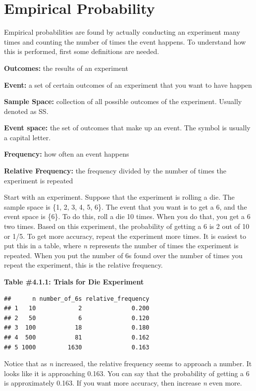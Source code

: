 \documentclass[
]{book}
\begin{document}
\hypertarget{empirical-probability}{%
\section{Empirical Probability}\label{empirical-probability}}

Empirical probabilities are found by actually conducting an experiment many times and counting the number of times the event happens. To understand how this is performed, first some definitions are needed.

\textbf{Outcomes:} the results of an experiment

\textbf{Event:} a set of certain outcomes of an experiment that you want to have happen

\textbf{Sample Space:} collection of all possible outcomes of the experiment. Usually denoted as SS.

\textbf{Event space:} the set of outcomes that make up an event. The symbol is usually a capital letter.

\textbf{Frequency:} how often an event happens

\textbf{Relative Frequency:} the frequency divided by the number of times the experiment is repeated

Start with an experiment. Suppose that the experiment is rolling a die. The sample space is \{1, 2, 3, 4, 5, 6\}. The event that you want is to get a 6, and the event space is \{6\}. To do this, roll a die 10 times. When you do that, you get a 6 two times. Based on this experiment, the probability of getting a 6 is 2 out of 10 or 1/5. To get more accuracy, repeat the experiment more times. It is easiest to put this in a table, where \emph{n} represents the number of times the experiment is repeated. When you put the number of 6s found over the number of times you repeat the experiment, this is the relative frequency.

\textbf{Table \#4.1.1: Trials for Die Experiment}

\begin{verbatim}
##      n number_of_6s relative_frequency
## 1   10            2              0.200
## 2   50            6              0.120
## 3  100           18              0.180
## 4  500           81              0.162
## 5 1000         1630              0.163
\end{verbatim}

Notice that as \emph{n} increased, the relative frequency seems to approach a number. It looks like it is approaching 0.163. You can say that the probability of getting a 6 is approximately 0.163. If you want more accuracy, then increase \emph{n} even more.
\end{document}
